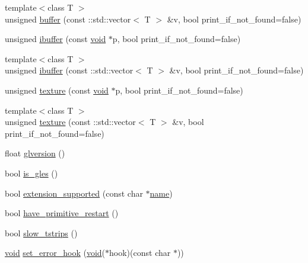 \begin{DoxyCompactItemize}
\item 
{\footnotesize template$<$class T $>$ }\\unsigned \hyperlink{classtrimesh_1_1GLManager_a4c49c8427129d49fe96046ccc4169d8c}{buffer} (const \+::std\+::vector$<$ T $>$ \&v, bool print\+\_\+if\+\_\+not\+\_\+found=false)
\item 
unsigned \hyperlink{classtrimesh_1_1GLManager_aadf7a71b53c652b787863c6826e3f5bb}{ibuffer} (const \hyperlink{namespacetrimesh_a784ddfd979e1c579bda795a8edfc3f43}{void} $\ast$p, bool print\+\_\+if\+\_\+not\+\_\+found=false)
\item 
{\footnotesize template$<$class T $>$ }\\unsigned \hyperlink{classtrimesh_1_1GLManager_a6830bb30902966f62e2696bb49cece03}{ibuffer} (const \+::std\+::vector$<$ T $>$ \&v, bool print\+\_\+if\+\_\+not\+\_\+found=false)
\item 
unsigned \hyperlink{classtrimesh_1_1GLManager_a77d5b5ec42d43f6cdc47edda3be7c914}{texture} (const \hyperlink{namespacetrimesh_a784ddfd979e1c579bda795a8edfc3f43}{void} $\ast$p, bool print\+\_\+if\+\_\+not\+\_\+found=false)
\item 
{\footnotesize template$<$class T $>$ }\\unsigned \hyperlink{classtrimesh_1_1GLManager_a21b8ae8f989ddd0a5bd339abf653b11e}{texture} (const \+::std\+::vector$<$ T $>$ \&v, bool print\+\_\+if\+\_\+not\+\_\+found=false)
\item 
float \hyperlink{classtrimesh_1_1GLManager_aeeceda504719cddfd792f3f45c060d62}{glversion} ()
\item 
bool \hyperlink{classtrimesh_1_1GLManager_adb060ab8b2a7e36d6ad58cca99e09c33}{is\+\_\+gles} ()
\item 
bool \hyperlink{classtrimesh_1_1GLManager_ada2891df7aa4c4566eeeadd2009b6b9c}{extension\+\_\+supported} (const char $\ast$\hyperlink{namespacetrimesh_a7f24cdcfa73387d7fa6aa44676238a79}{name})
\item 
bool \hyperlink{classtrimesh_1_1GLManager_af13c78d0ae6af5dd2cdf238a1e0c5090}{have\+\_\+primitive\+\_\+restart} ()
\item 
bool \hyperlink{classtrimesh_1_1GLManager_af32d8d8e06cecc35ec9c711f4fb8d4b7}{slow\+\_\+tstrips} ()
\item 
\hyperlink{namespacetrimesh_a784ddfd979e1c579bda795a8edfc3f43}{void} \hyperlink{classtrimesh_1_1GLManager_a24c890057b5373b8a618a524b07065ba}{set\+\_\+error\+\_\+hook} (\hyperlink{namespacetrimesh_a784ddfd979e1c579bda795a8edfc3f43}{void}($\ast$hook)(const char $\ast$))
\end{DoxyCompactItemize}



